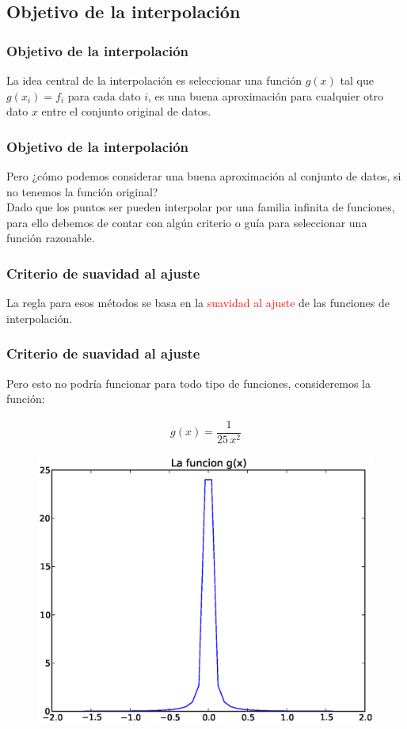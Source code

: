 \subsection{Objetivo de la interpolación}
\begin{frame}
\frametitle{Objetivo de la interpolación}
La idea central de la interpolación es seleccionar una función $g(x)$ tal que $g(x_{i}) = f_{i}$ para cada dato $i$, es una buena aproximación para cualquier otro dato $x$ entre el conjunto original de datos.
\end{frame}
\begin{frame}
\frametitle{Objetivo de la interpolación}
Pero ¿cómo podemos considerar una buena aproximación al conjunto de datos, si no tenemos la función original?
\\
\bigskip
Dado que los puntos ser pueden interpolar por una familia infinita de funciones, para ello debemos de contar con algún criterio o guía para seleccionar una función razonable.
\end{frame}
\begin{frame}
\frametitle{Criterio de suavidad al ajuste}
La regla para esos métodos se basa en la \textcolor{red}{suavidad al ajuste} de las funciones de interpolación.
\end{frame}
\begin{frame}
\frametitle{Criterio de suavidad al ajuste}
Pero esto no podría funcionar para todo tipo de funciones, consideremos la función:
\\
\medskip
\begin{minipage}{3cm}
\begin{align*}
g(x) = \dfrac{1}{25 \, x^{2}}
\end{align*}
\end{minipage}
\hspace{0.5cm}
\begin{minipage}{6cm}
\begin{figure}
	\centering
	 \includegraphics[scale=0.3]{Imagenes/grafica02.eps}  
\end{figure}
\end{minipage}
\end{frame}
